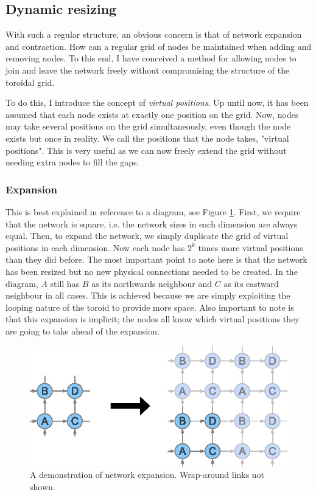 \documentclass[ %
                    author={Luke Murray},
                supervisor={Dr. Simon Hollis},
                     title={Shadow Peer-to-Peer Networks},
                  subtitle={},
                    degree={MEng},
                      year={2013} ]{thesis}
\begin{document}
\subsection{Dynamic resizing}

With such a regular structure, an obvious concern is that of network expansion and contraction. How can a regular grid of nodes be maintained when adding and removing nodes. To this end, I have conceived a method for allowing nodes to join and leave the network freely without compromising the structure of the toroidal grid.

To do this, I introduce the concept of {\em virtual positions}. Up until now, it has been assumed that each node exists at exactly one position on the grid. Now, nodes may take several positions on the grid simultaneously, even though the node exists but once in reality. We call the positions that the node takes, "virtual positions". This is very useful as we can now freely extend the grid without needing extra nodes to fill the gaps.

\subsubsection{Expansion}

This is best explained in reference to a diagram, see Figure \ref{expand}. First, we require that the network is square, i.e. the network sizes in each dimension are always equal. Then, to expand the network, we simply duplicate the grid of virtual positions in each dimension. Now each node has $2^{k}$ times more virtual positions than they did before. The most important point to note here is that the network has been resized but no new physical connections needed to be created. In the diagram, $A$ still has $B$ as its northwards neighbour and $C$ as its eastward neighbour in all cases. This is achieved because we are simply exploiting the looping nature of the toroid to provide more space. Also important to note is that this expansion is implicit; the nodes all know which virtual positions they are going to take ahead of the expansion.

\begin{figure}[h]
    \centering
    \includegraphics{diagrams/network_expand.eps}
    \caption{A demonstration of network expansion. Wrap-around links not shown.}
    \label{expand}
\end{figure}
\end{document}

